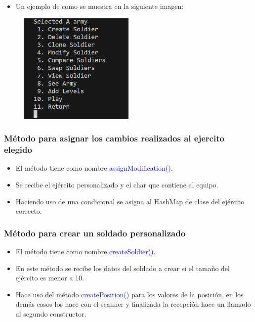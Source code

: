\documentclass{article}
\begin{document}
\newpage

\begin{itemize}\begin{itemize}\item Un ejemplo de como se muestra en la siguiente imagen:
\end{itemize}\end{itemize}
\begin{figure}[H]
    \centering
    \includegraphics[width=0.5\textwidth,keepaspectratio]{img/12customGameArmy.png}
    \caption{}
\end{figure}


\subsubsection{Método para asignar los cambios realizados al ejercito elegido}
\begin{itemize}
    \item El método tiene como nombre \textcolor{blue}{assignModification()}.
    \item Se recibe el ejército personalizado y el char que contiene al equipo.
    \item Haciendo uso de una condicional se asigna al HashMap de clase del ejército correcto.
\end{itemize}



\subsubsection{Método para crear un soldado personalizado}
\begin{itemize}
    \item El método tiene como nombre \textcolor{blue}{createSoldier()}.
    \item En este método se recibe los datos del soldado a crear si el tamaño del ejército es menor a 10.
    \item Hace uso del método \textcolor{blue}{createPosition()} para los valores de la posición, en los demás casos los hace con el scanner y finalizada la recepción hace un llamado al segundo constructor.
\end{itemize}

\end{document}

